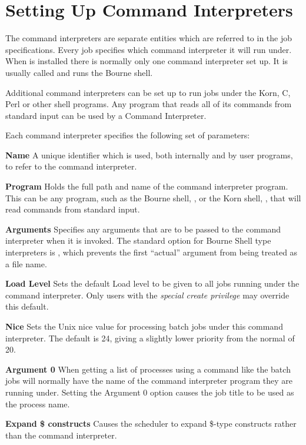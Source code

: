 \section{Setting Up Command Interpreters}
The command interpreters are separate entities which are referred to in
the job specifications. Every job specifies which command interpreter
it will run under. When \ProductName{} is installed there is normally only
one command interpreter set up. It is usually called
 and runs the Bourne shell.

Additional command interpreters can be set up to run jobs under the
Korn, C, Perl or other shell programs. Any program that reads all of
its commands from standard input can be used by a \ProductName{} Command
Interpreter.

Each command interpreter specifies the following set of parameters:

\begin{description}
\item{\bfseries{Name}}
A unique identifier which is used, both internally and by user programs,
to refer to the command interpreter.
\item{\bfseries{Program}}
Holds the full path and name of the command interpreter program. This
can be any program, such as the Bourne shell,
, or the Korn shell,
, that will read commands from standard
input.
\item{\bfseries{Arguments}}
Specifies any arguments that are to be passed to the command interpreter
when it is invoked. The standard option for Bourne Shell type
interpreters is , which prevents the first
``actual'' argument from being treated as a
file name.
\item{\bfseries{Load Level}}
Sets the default Load level to be given to all jobs running under the
command interpreter. Only users with the \textit{special create
privilege} may override this default.
\item{\bfseries{Nice}}
Sets the Unix nice value for processing batch jobs under this command
interpreter. The default is 24, giving a slightly lower priority from
the normal of 20.
\item{\bfseries{Argument 0}}
When getting a list of processes using a command like
 the batch jobs will normally have the name of
the command interpreter program they are running under. Setting the
Argument 0 option causes the job title to be used as the process name.
\item{\bfseries{Expand \$ constructs}}
Causes the scheduler to expand \$-type constructs rather than the
command interpreter.
\end{description}


